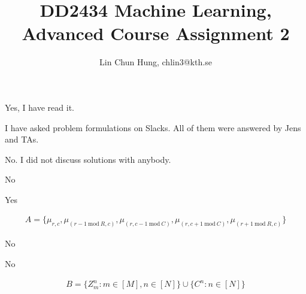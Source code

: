 \documentclass[12pt]{article}
\newenvironment{problem}[2][Problem]{\begin{trivlist}
\item[\hskip \labelsep {\bfseries #1}\hskip \labelsep {\bfseries #2.}]}{\end{trivlist}}
\begin{document}
 
 
\title{DD2434 Machine Learning, Advanced Course Assignment 2}
\author{Lin Chun Hung, chlin3@kth.se}
\maketitle
\begin{problem}{2.1.1}
    Yes, I have read it.
\end{problem}
\begin{problem}{2.1.2}
    I have asked problem formulations on Slacks. All of them were answered by Jens
    and TAs.
\end{problem}
\begin{problem}{2.1.3}
    No. I did not discuss solutions with anybody.
\end{problem}
\begin{problem}{2.2.4}
    No
\end{problem}
\begin{problem}{2.2.5}
    Yes
\end{problem}
\begin{problem}{2.2.6}
\begin{align*}
    A = \{ \mu_{r,c}, 
            \mu_{(r-1 ~\text{mod}~ R,c)},
            \mu_{(r, c-1 ~\text{mod}~ C)},
            \mu_{(r, c+1 ~\text{mod}~ C)},
            \mu_{(r+1 ~\text{mod}~ R,c)}
        \}    
\end{align*}
\end{problem}
\begin{problem}{2.2.7}
    No
\end{problem}
\begin{problem}{2.2.8}
    No
\end{problem}
\begin{problem}{2.2.9}
\begin{align*}
    B = \{ Z^n_m: m \in [M], n \in [N]\} \cup \{ C^n: n \in [N]\}
\end{align*}
\end{problem}
\pagebreak
\end{document}
